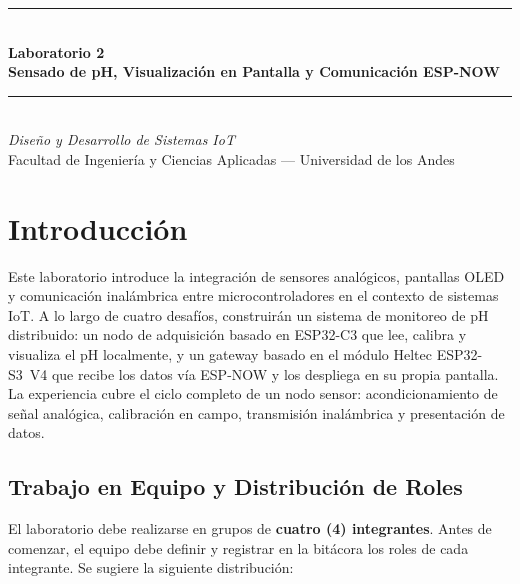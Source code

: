 \documentclass[12pt,leqno]{article}
\begin{document}
\setlength{\parindent}{0.5cm}

\begin{center}
    {\color{azuluandes}\rule{\textwidth}{1.5pt}}\\[0.4cm]
    \textbf{\LARGE Laboratorio 2}\\[0.3cm]
    \textbf{\Large Sensado de pH, Visualizaci\'on en Pantalla y Comunicaci\'on ESP-NOW}\\[0.3cm]
    {\color{azuluandes}\rule{\textwidth}{1.5pt}}\\[0.2cm]
    \textit{Dise\~no y Desarrollo de Sistemas IoT}\\
    Facultad de Ingenier\'ia y Ciencias Aplicadas --- Universidad de los Andes\\[0.3cm]
\end{center}

\section{Introducci\'on}

Este laboratorio introduce la integraci\'on de sensores anal\'ogicos, pantallas OLED
y comunicaci\'on inal\'ambrica entre microcontroladores en el contexto de sistemas
IoT. A lo largo de cuatro desaf\'ios, construir\'an un sistema de monitoreo de pH
distribuido: un nodo de adquisici\'on basado en ESP32-C3 que lee, calibra y visualiza
el pH localmente, y un gateway basado en el m\'odulo Heltec ESP32-S3~V4 que recibe
los datos v\'ia ESP-NOW y los despliega en su propia pantalla. La experiencia cubre
el ciclo completo de un nodo sensor: acondicionamiento de se\~nal anal\'ogica,
calibraci\'on en campo, transmisi\'on inal\'ambrica y presentaci\'on de datos.

\subsection{Trabajo en Equipo y Distribuci\'on de Roles}

El laboratorio debe realizarse en grupos de \textbf{cuatro (4) integrantes}. Antes
de comenzar, el equipo debe definir y registrar en la bit\'acora los roles de cada
integrante. Se sugiere la siguiente distribuci\'on:
\end{document}
